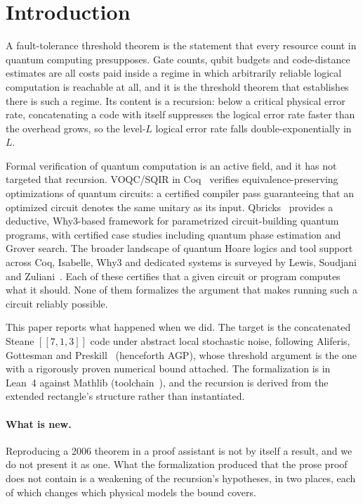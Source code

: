 \documentclass[aps,prx,reprint,nofootinbib,superscriptaddress]{revtex4-2}
\begin{document}
\section{Introduction}
\label{sec:intro}

A fault-tolerance threshold theorem is the statement that every resource count
in quantum computing presupposes. Gate counts, qubit budgets and code-distance
estimates are all costs paid inside a regime in which arbitrarily reliable
logical computation is reachable at all, and it is the threshold theorem that
establishes there is such a regime. Its content is a recursion: below a critical
physical error rate, concatenating a code with itself suppresses the logical
error rate faster than the overhead grows, so the level-$L$ logical error rate
falls double-exponentially in $L$.

Formal verification of quantum computation is an active field, and it has not
targeted that recursion. VOQC/SQIR in Coq~\cite{Hietala2020VOQC} verifies
equivalence-preserving optimizations of quantum circuits: a certified compiler
pass guaranteeing that an optimized circuit denotes the same unitary as its
input. Qbricks~\cite{Chareton2021Qbricks} provides a deductive, Why3-based
framework for parametrized circuit-building quantum programs, with certified
case studies including quantum phase estimation and Grover search. The broader
landscape of quantum Hoare logics and tool support across Coq, Isabelle, Why3
and dedicated systems is surveyed by Lewis, Soudjani and
Zuliani~\cite{Lewis2021VerifQC}. Each of these certifies that a given circuit or
program computes what it should. None of them formalizes the argument that
makes running such a circuit reliably possible.

This paper reports what happened when we did. The target is the concatenated
Steane $[[7,1,3]]$ code under abstract local stochastic noise, following
Aliferis, Gottesman and Preskill~\cite{AGP2006} (henceforth AGP), whose threshold
argument is the one with a rigorously proven numerical bound attached. The
formalization is in Lean~4 against Mathlib \texttt{\mathlibrev}
(toolchain~\leantoolchain), and the recursion is derived from the extended
rectangle's structure rather than instantiated.

\paragraph{What is new.} Reproducing a 2006 theorem in a proof assistant is not
by itself a result, and we do not present it as one. What the formalization
produced that the prose proof does not contain is a weakening of the recursion's
hypotheses, in two places, each of which changes which physical models the bound
covers.
\end{document}
